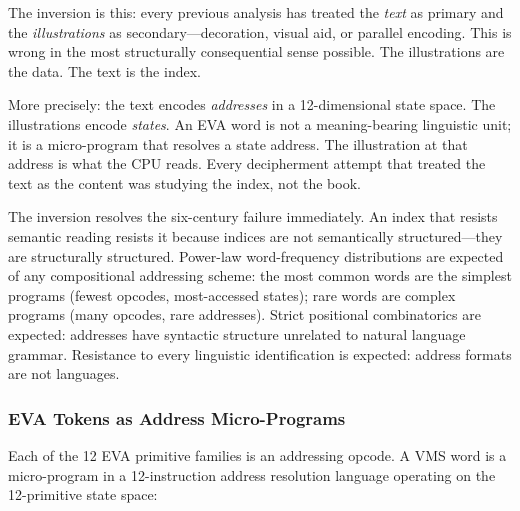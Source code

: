\documentclass[12pt,a4paper]{article}
\begin{document}
The inversion is this: every previous analysis has treated the \emph{text} as primary and the \emph{illustrations} as secondary---decoration, visual aid, or parallel encoding. This is wrong in the most structurally consequential sense possible. The illustrations are the data. The text is the index.

More precisely: the text encodes \emph{addresses} in a 12-dimensional state space. The illustrations encode \emph{states}. An EVA word is not a meaning-bearing linguistic unit; it is a micro-program that resolves a state address. The illustration at that address is what the CPU reads. Every decipherment attempt that treated the text as the content was studying the index, not the book.

The inversion resolves the six-century failure immediately. An index that resists semantic reading resists it because indices are not semantically structured---they are structurally structured. Power-law word-frequency distributions are expected of any compositional addressing scheme: the most common words are the simplest programs (fewest opcodes, most-accessed states); rare words are complex programs (many opcodes, rare addresses). Strict positional combinatorics are expected: addresses have syntactic structure unrelated to natural language grammar. Resistance to every linguistic identification is expected: address formats are not languages.

\subsubsection{EVA Tokens as Address Micro-Programs}

Each of the 12 EVA primitive families is an addressing opcode. A VMS word is a micro-program in a 12-instruction address resolution language operating on the 12-primitive state space:
\end{document}
